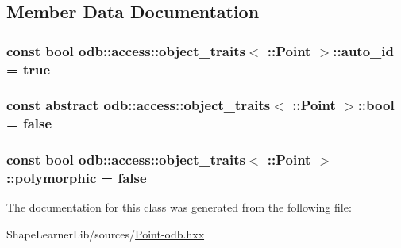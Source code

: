 \subsection{Member Data Documentation}
\hypertarget{classodb_1_1access_1_1object__traits_3_01_1_1_point_01_4_ad7924985c2ccfd40f9fd3371706e44d1}{}
\subsubsection[{auto\+\_\+id}]{\setlength{\rightskip}{0pt plus 5cm}const {\bf bool} odb\+::access\+::object\+\_\+traits$<$ \+::{\bf Point} $>$\+::auto\+\_\+id = true\hspace{0.3cm}{\ttfamily [static]}}\label{classodb_1_1access_1_1object__traits_3_01_1_1_point_01_4_ad7924985c2ccfd40f9fd3371706e44d1}
\hypertarget{classodb_1_1access_1_1object__traits_3_01_1_1_point_01_4_ab6e90357769eac9024011ae278acc043}{}
\subsubsection[{bool}]{\setlength{\rightskip}{0pt plus 5cm}const abstract odb\+::access\+::object\+\_\+traits$<$ \+::{\bf Point} $>$\+::bool = false\hspace{0.3cm}{\ttfamily [static]}}\label{classodb_1_1access_1_1object__traits_3_01_1_1_point_01_4_ab6e90357769eac9024011ae278acc043}
\hypertarget{classodb_1_1access_1_1object__traits_3_01_1_1_point_01_4_a0bd4a8954599342247e4dd80cd393971}{}
\subsubsection[{polymorphic}]{\setlength{\rightskip}{0pt plus 5cm}const {\bf bool} odb\+::access\+::object\+\_\+traits$<$ \+::{\bf Point} $>$\+::polymorphic = false\hspace{0.3cm}{\ttfamily [static]}}\label{classodb_1_1access_1_1object__traits_3_01_1_1_point_01_4_a0bd4a8954599342247e4dd80cd393971}


The documentation for this class was generated from the following file\+:\begin{DoxyCompactItemize}
\item 
Shape\+Learner\+Lib/sources/\hyperlink{_point-odb_8hxx}{Point-\/odb.\+hxx}\end{DoxyCompactItemize}
